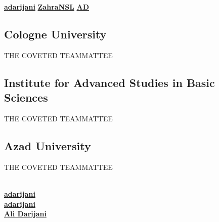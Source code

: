 \documentclass[a4paper]{MagicalCV}
\begin{document}
\lastupdated

  \href{https://github.com/adarijani}{\bf adarijani} 
 \href{https://github.com/ZahraNSL}{\bf ZahraNSL}
 \href{https://www.linkedin.com/in/zahra-hs-nasrollah-439064a2/}{\bf AD}


\begin{minipage}[t]{0.33\textwidth} 


\subsection{Cologne University}
\vspace{\topsep} %
\begin{tightemize}
\item THE COVETED TEAMMATTEE
\end{tightemize}
\sectionsep

\subsection{Institute for Advanced Studies in Basic Sciences}
\begin{tightemize}
\item THE COVETED TEAMMATTEE
\end{tightemize}
\sectionsep

\subsection{Azad University}
\begin{tightemize}
\item THE COVETED TEAMMATTEE
\end{tightemize}
\sectionsep

\\
 \href{https://github.com/adarijani}{\bf adarijani} \\
 \href{https://github.com/adarijani}{\bf adarijani} \\
 \href{https://www.linkedin.com/in/ali-darijani-675b52241/}{\bf Ali Darijani}
\sectionsep


\end{minipage}
\end{document}
